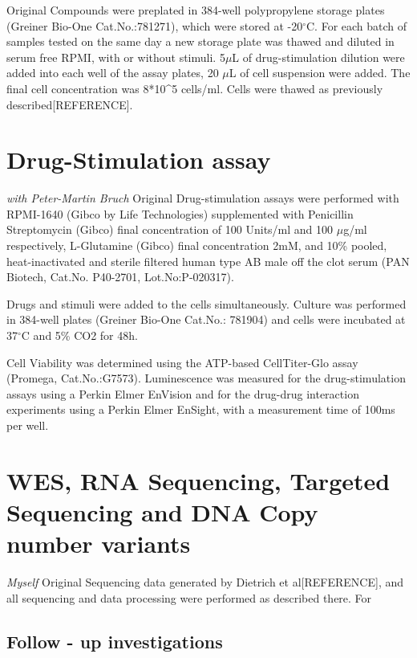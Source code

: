 \documentclass[11pt, a4paper, twosided]{book}
\begin{document}
Original
Compounds were preplated in 384-well polypropylene storage plates (Greiner Bio-One Cat.No.:781271), which were stored at -20\(^\circ\)C. For each batch of samples tested on the same day a new storage plate was thawed and diluted in serum free RPMI, with or without stimuli. 5\(\mu\)L of drug-stimulation dilution were added into each well of the assay plates, 20 \(\mu\)L of cell suspension were added. The final cell concentration was 8*10\^{}5 cells/ml. Cells were thawed as previously described{[}REFERENCE{]}.

\hypertarget{drug-stimulation-assay}{%
\section{Drug-Stimulation assay}\label{drug-stimulation-assay}}

\emph{with Peter-Martin Bruch} Original
Drug-stimulation assays were performed with RPMI-1640 (Gibco by Life Technologies) supplemented with Penicillin Streptomycin (Gibco) final concentration of 100 Units/ml and 100 \(\mu\)g/ml respectively, L-Glutamine (Gibco) final concentration 2mM, and 10\% pooled, heat-inactivated and sterile filtered human type AB male off the clot serum (PAN Biotech, Cat.No. P40-2701, Lot.No:P-020317).

Drugs and stimuli were added to the cells simultaneously. Culture was performed in 384-well plates (Greiner Bio-One Cat.No.: 781904) and cells were incubated at 37\(^\circ\)C and 5\% CO2 for 48h.

Cell Viability was determined using the ATP-based CellTiter-Glo assay (Promega, Cat.No.:G7573). Luminescence was measured for the drug-stimulation assays using a Perkin Elmer EnVision and for the drug-drug interaction experiments using a Perkin Elmer EnSight, with a measurement time of 100ms per well.

\hypertarget{wes-rna-sequencing-targeted-sequencing-and-dna-copy-number-variants}{%
\section{WES, RNA Sequencing, Targeted Sequencing and DNA Copy number variants}\label{wes-rna-sequencing-targeted-sequencing-and-dna-copy-number-variants}}

\emph{Myself} Original
Sequencing data generated by Dietrich et al{[}REFERENCE{]}, and all sequencing and data processing were performed as described there. For

\hypertarget{follow---up-investigations}{%
\subsection{Follow - up investigations}\label{follow---up-investigations}}
\end{document}
